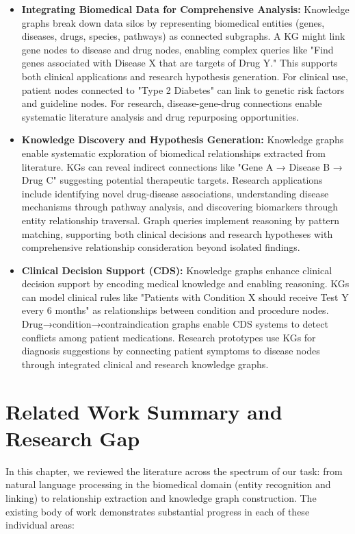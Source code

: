 \begin{itemize}
\item \textbf{Integrating Biomedical Data for Comprehensive Analysis:} Knowledge graphs break down data silos by representing biomedical entities (genes, diseases, drugs, species, pathways) as connected subgraphs. A KG might link gene nodes to disease and drug nodes, enabling complex queries like "Find genes associated with Disease X that are targets of Drug Y." This supports both clinical applications and research hypothesis generation. For clinical use, patient nodes connected to "Type 2 Diabetes" can link to genetic risk factors and guideline nodes. For research, disease-gene-drug connections enable systematic literature analysis and drug repurposing opportunities.

\item \textbf{Knowledge Discovery and Hypothesis Generation:} Knowledge graphs enable systematic exploration of biomedical relationships extracted from literature. KGs can reveal indirect connections like "Gene A → Disease B → Drug C" suggesting potential therapeutic targets. Research applications include identifying novel drug-disease associations, understanding disease mechanisms through pathway analysis, and discovering biomarkers through entity relationship traversal. Graph queries implement reasoning by pattern matching, supporting both clinical decisions and research hypotheses with comprehensive relationship consideration beyond isolated findings.

\item \textbf{Clinical Decision Support (CDS):} Knowledge graphs enhance clinical decision support by encoding medical knowledge and enabling reasoning. KGs can model clinical rules like "Patients with Condition X should receive Test Y every 6 months" as relationships between condition and procedure nodes. Drug→condition→contraindication graphs enable CDS systems to detect conflicts among patient medications. Research prototypes use KGs for diagnosis suggestions by connecting patient symptoms to disease nodes through integrated clinical and research knowledge graphs.
\end{itemize}

\section{Related Work Summary and Research Gap}

In this chapter, we reviewed the literature across the spectrum of our task: from natural language processing in the biomedical domain (entity recognition and linking) to relationship extraction and knowledge graph construction. The existing body of work demonstrates substantial progress in each of these individual areas:


